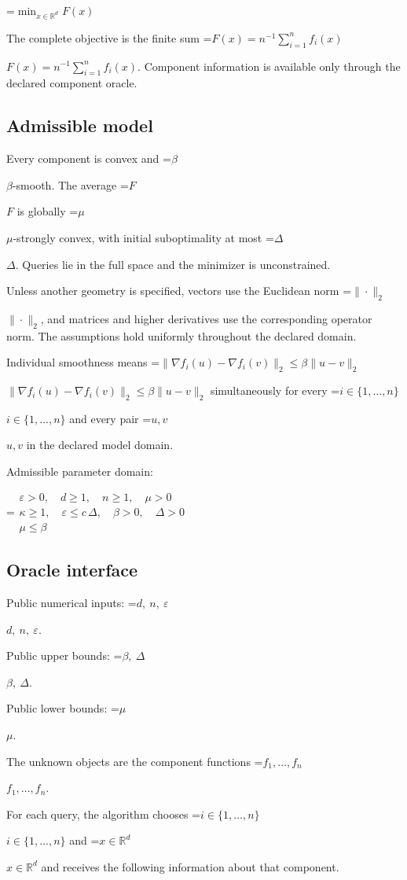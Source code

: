 \documentclass[10pt,a4paper]{article}
\newcommand{\AtlasMath}[1]{\par\begingroup\centering\setbox0=\hbox{$\displaystyle #1$}\ifdim\wd0>1.4\linewidth\typeout{ATLAS WIDE FORMULA: \the\wd0}\fi\ifdim\wd0>\linewidth\resizebox{\linewidth}{!}{\box0}\else\box0\fi\par\endgroup}
\newcommand{\AtlasInlineMath}[1]{\begingroup\setbox0=\hbox{$#1$}\ifdim\wd0>.4\linewidth\endgroup\AtlasMath{#1}\else\endgroup$#1$\fi}
\begin{document}
\AtlasMath{\min_{x\in \mathbb{R}^d}F(x)}


The complete objective is the finite sum \AtlasInlineMath{F(x)=n^{-1}\sum_{i=1}^n f_i(x)}. Component information is available only through the declared component oracle.

\subsection{Admissible model}
Every component is convex and \AtlasInlineMath{\beta}-smooth. The average \AtlasInlineMath{F} is globally \AtlasInlineMath{\mu}-strongly convex, with initial suboptimality at most \AtlasInlineMath{\Delta}. Queries lie in the full space and the minimizer is unconstrained.

Unless another geometry is specified, vectors use the Euclidean norm \AtlasInlineMath{\|\cdot\|_2}, and matrices and higher derivatives use the corresponding operator norm. The assumptions hold uniformly throughout the declared domain.

Individual smoothness means \AtlasInlineMath{\|\nabla f_i(u)-\nabla f_i(v)\|_2\le\beta\|u-v\|_2} simultaneously for every \AtlasInlineMath{i\in\{1,\ldots,n\}} and every pair \AtlasInlineMath{u,v} in the declared model domain.

Admissible parameter domain:


\AtlasMath{\begin{gathered}\varepsilon > 0,\quad d \ge 1,\quad n \ge 1,\quad \mu > 0\\\kappa \ge 1,\quad \varepsilon \le c\,\Delta,\quad \beta > 0,\quad \Delta > 0\\\mu \le \beta\end{gathered}}


\subsection{Oracle interface}
Public numerical inputs: \AtlasInlineMath{d,\ n,\ \varepsilon}.

Public upper bounds: \AtlasInlineMath{\beta,\ \Delta}.

Public lower bounds: \AtlasInlineMath{\mu}.

The unknown objects are the component functions \AtlasInlineMath{f_1,\ldots,f_n}.

For each query, the algorithm chooses \AtlasInlineMath{i\in\{1,\ldots,n\}} and \AtlasInlineMath{x\in\mathbb R^d} and receives the following information about that component.
\end{document}
